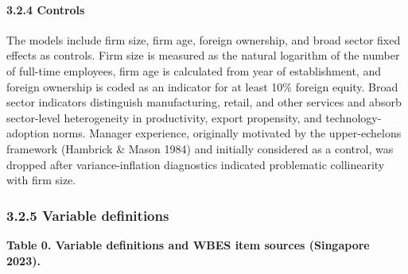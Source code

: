\documentclass[12pt,a4paper]{article}
\begin{document}
\hypertarget{324-controls}{%
\paragraph{3.2.4 Controls}\label{324-controls}}

The models include firm size, firm age, foreign ownership, and broad
sector fixed effects as controls. Firm size is measured as the natural
logarithm of the number of full-time employees, firm age is calculated
from year of establishment, and foreign ownership is coded as an
indicator for at least 10\% foreign equity. Broad sector indicators
distinguish manufacturing, retail, and other services and absorb
sector-level heterogeneity in productivity, export propensity, and
technology-adoption norms. Manager experience, originally motivated by
the upper-echelons framework (Hambrick \& Mason 1984) and initially
considered as a control, was dropped after variance-inflation
diagnostics indicated problematic collinearity with firm size.

\hypertarget{325-variable-definitions}{%
\subsubsection{3.2.5 Variable
definitions}\label{325-variable-definitions}}

\textbf{Table 0. Variable definitions and WBES item sources (Singapore
2023).}
\end{document}
